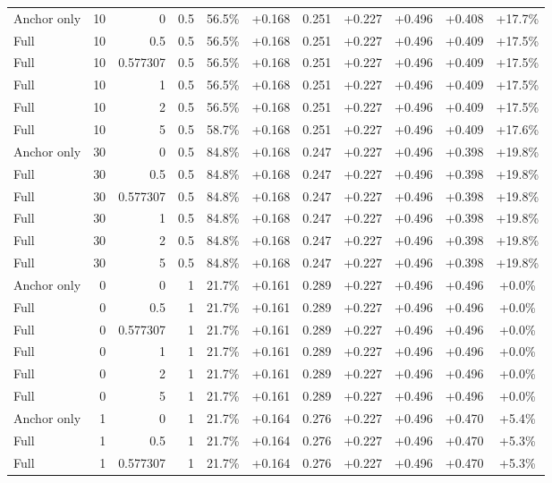 \begin{table}[htbp]
\begin{tabular}{lrrrccccccc}
Anchor only & 10 & 0 & 0.5 & 56.5\% & +0.168 & 0.251 & +0.227 & +0.496 & +0.408 & +17.7\% \\
Full & 10 & 0.5 & 0.5 & 56.5\% & +0.168 & 0.251 & +0.227 & +0.496 & +0.409 & +17.5\% \\
Full & 10 & 0.577307 & 0.5 & 56.5\% & +0.168 & 0.251 & +0.227 & +0.496 & +0.409 & +17.5\% \\
Full & 10 & 1 & 0.5 & 56.5\% & +0.168 & 0.251 & +0.227 & +0.496 & +0.409 & +17.5\% \\
Full & 10 & 2 & 0.5 & 56.5\% & +0.168 & 0.251 & +0.227 & +0.496 & +0.409 & +17.5\% \\
Full & 10 & 5 & 0.5 & 58.7\% & +0.168 & 0.251 & +0.227 & +0.496 & +0.409 & +17.6\% \\
Anchor only & 30 & 0 & 0.5 & 84.8\% & +0.168 & 0.247 & +0.227 & +0.496 & +0.398 & +19.8\% \\
Full & 30 & 0.5 & 0.5 & 84.8\% & +0.168 & 0.247 & +0.227 & +0.496 & +0.398 & +19.8\% \\
Full & 30 & 0.577307 & 0.5 & 84.8\% & +0.168 & 0.247 & +0.227 & +0.496 & +0.398 & +19.8\% \\
Full & 30 & 1 & 0.5 & 84.8\% & +0.168 & 0.247 & +0.227 & +0.496 & +0.398 & +19.8\% \\
Full & 30 & 2 & 0.5 & 84.8\% & +0.168 & 0.247 & +0.227 & +0.496 & +0.398 & +19.8\% \\
Full & 30 & 5 & 0.5 & 84.8\% & +0.168 & 0.247 & +0.227 & +0.496 & +0.398 & +19.8\% \\
Anchor only & 0 & 0 & 1 & 21.7\% & +0.161 & 0.289 & +0.227 & +0.496 & +0.496 & +0.0\% \\
Full & 0 & 0.5 & 1 & 21.7\% & +0.161 & 0.289 & +0.227 & +0.496 & +0.496 & +0.0\% \\
Full & 0 & 0.577307 & 1 & 21.7\% & +0.161 & 0.289 & +0.227 & +0.496 & +0.496 & +0.0\% \\
Full & 0 & 1 & 1 & 21.7\% & +0.161 & 0.289 & +0.227 & +0.496 & +0.496 & +0.0\% \\
Full & 0 & 2 & 1 & 21.7\% & +0.161 & 0.289 & +0.227 & +0.496 & +0.496 & +0.0\% \\
Full & 0 & 5 & 1 & 21.7\% & +0.161 & 0.289 & +0.227 & +0.496 & +0.496 & +0.0\% \\
Anchor only & 1 & 0 & 1 & 21.7\% & +0.164 & 0.276 & +0.227 & +0.496 & +0.470 & +5.4\% \\
Full & 1 & 0.5 & 1 & 21.7\% & +0.164 & 0.276 & +0.227 & +0.496 & +0.470 & +5.3\% \\
Full & 1 & 0.577307 & 1 & 21.7\% & +0.164 & 0.276 & +0.227 & +0.496 & +0.470 & +5.3\% \\

\end{tabular}
\end{table}
